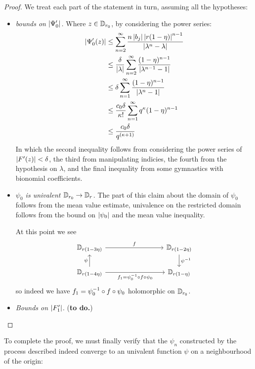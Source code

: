 \documentclass[../main.tex]{subfiles}
\begin{document}
\begin{proof}
We treat each part of the statement in turn, assuming all the hypotheses:

\begin{itemize}
    \item \emph{bounds on $\left|\Psi_0'\right|$.} Where $z \in \mathbb{D}_{r_0}$, by considering the power series:
    \begin{align*}
    \left|\Psi_0'(z)\right|
    &\le
    \sum_{n=2}^\infty \frac{n \left|b_j\right| \left|r(1-\eta)\right|^{n-1}}{\left|\lambda^n - \lambda\right|}\\
    &\le
    \frac{\delta}{\left|\lambda\right|}
    \sum_{n=2}^\infty \frac{(1-\eta)^{n-1}}{\left|\lambda^{n-1} - 1\right|}\\
    &\le \delta \sum_{n=1}^\infty \frac{(1-\eta)^{n-1}}{\left|\lambda^n - 1\right|}\\
    &\le \frac{c_0\delta}{\kappa!} \sum_{n=1}^\infty
    q^\kappa (1-\eta)^{n-1}\\
    &\le \frac{c_0\delta}{q^{(\kappa+1)}}
    \end{align*}
    In which the second inequality follows from considering the power series of $\left|F'(z)\right| < \delta$, the third from manipulating indicies, the fourth from the hypothesis on $\lambda$, and the final inequality from some gymnastics with bionomial coefficients.

    \item \emph{$\psi_0$ is univalent $\mathbb{D}_{r_0} \to \mathbb{D}_r$.} The part of this claim about the domain of $\psi_0$ follows from the mean value estimate, univalence on the restricted domain follows from the bound on $\left|\psi_0\right|$ and the mean value inequality.
    
    At this point we see
    \[
        \begin{tikzcd}
        \D_{r(1-3\eta)} \ar[r, "f"] &[6em] \D_{r(1-2\eta)} \ar[d, "\psi\inv"]\\
        \D_{r(1-4\eta)} \ar[r, "f_1 = \psi_0\inv \circ f \circ \psi_0"']
        \ar[u, "\psi"] & \D_{r(1-\eta)}
        \end{tikzcd}
    \]
    so indeed we have $f_1 = \psi_0^{-1} \circ f \circ \psi_0$ holomorphic on $\mathbb{D}_{r_0}$.
    
    \item \emph{Bounds on $\left|F'_1\right|$.} (\textbf{to do.})
\end{itemize}

\end{proof}

To complete the proof, we must finally verify that the $\psi_n$ constructed by the process described indeed converge to an univalent function $\psi$ on a neighbourhood of the origin:
\end{document}
